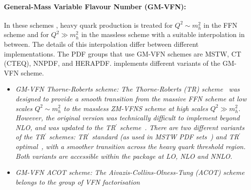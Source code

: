 \paragraph{General-Mass Variable Flavour Number (GM-VFN)\rm:\\}
In these schemes \cite{VFN}, heavy quark production is treated for
$Q^2 \sim m_h^2$ in the FFN scheme and for $Q^2 \gg m_h^2$
in the massless scheme with a suitable interpolation in between. 
The details of this interpolation differ between different implementations.
The PDF groups that use GM-VFN schemes are MSTW, CT (CTEQ), NNPDF, and HERAPDF.
\fitter implements different variants of the GM-VFN scheme.
% 
\begin{itemize}
%
\item \it {GM-VFN Thorne-Roberts scheme:} \rm
%
%
The Thorne-Roberts (TR) scheme~\cite{Thorne:1997ga} was designed to provide a smooth transition 
from the massive FFN scheme at low scales $Q^2 \sim m_h^2$ to the massless ZM-VFNS scheme at high scales $Q^2 \gg m_h^2$. 
However, the original version was technically difficult to implement beyond NLO, and was updated 
to the TR$^\prime$ scheme~\cite{Thorne:2006qt}.
There are two different variants of the TR$^\prime$ schemes: TR$^\prime$ standard (as used in MSTW PDF sets~\cite{Thorne:2006qt,MSTWpdf}) 
and TR$^\prime$ optimal~\cite{Thorne:6180}, with a smoother transition across the heavy quark threshold region. 
Both variants are accessible within the \fitter package at LO, NLO and NNLO.
\vspace{0.1cm}
\item \it {GM-VFN ACOT scheme:} \rm
The Aivazis-Collins-Olness-Tung (ACOT) scheme belongs to the group of VFN factorisation 

\end{itemize}
